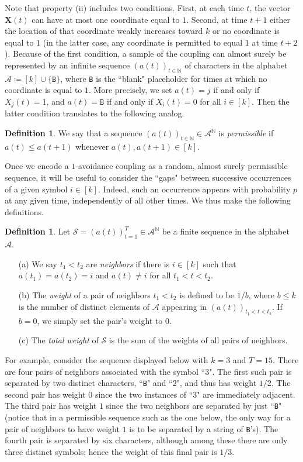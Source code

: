 \documentclass[11pt,reqno]{amsart} %
\numberwithin{equation}{section}
\newcommand{\N}{\mathbb{N}}
\renewcommand{\a}{\mathcal{A}}
\newcommand{\s}{\mathcal{S}}
\theoremstyle{definition}
\newtheorem{defn}[thm]{Definition}
\newcommand{\vc}[1]{{\mathbf #1}}
\begin{document}
Note that property (ii) includes two conditions.  
First, at each time $t$, the vector $\vc X(t)$ can have at most one coordinate equal to $1$.
Second, at time $t+1$ either the location of that coordinate weakly increases toward $k$ or no coordinate is equal to $1$ (in the latter case, any coordinate is permitted to equal $1$ at time $t+2$).
Because of the first condition, a sample of the coupling can almost surely be represented by an infinite sequence $(a(t))_{t\in\N}$ of characters in the alphabet $\a \coloneqq [k] \cup \{\texttt{B}\}$, where \texttt{B} is the ``blank" placeholder for times at which no coordinate is equal to $1$.
More precisely, we set $a(t) = j$ if and only if $X_j(t) = 1$, and $a(t) = \texttt{B}$ if and only if $X_i(t) = 0$ for all $i\in[k]$.
Then the latter condition translates to the following analog.

\begin{defn} \label{permissible_defn}
We say that a sequence $(a(t))_{t\in\N} \in \a^\N$ is \textit{permissible} if $a(t) \leq a(t+1)$ whenever $a(t),a(t+1) \in [k]$.
\end{defn}

Once we encode a $1$-avoidance coupling as a random, almost surely permissible sequence, it will be useful to consider the ``gaps" between successive occurrences of a given symbol $i \in [k]$.
Indeed, such an occurrence appears with probability $p$ at any given time, independently of all other times.
We thus make the following definitions.

\begin{defn} \label{weight_defn}
Let $\s = (a(t))_{t=1}^T \in \a^\N$ be a finite sequence in the alphabet $\a$.
\begin{itemize}
\item[(a)] We say $t_1 < t_2$ are \textit{neighbors} if there is $i \in [k]$ such that $a(t_1) = a(t_2) = i$ and $a(t) \neq i$ for all $t_1 < t < t_2$.
\item[(b)] The \emph{weight} of a pair of neighbors $t_1 < t_2$ is defined to be $1/b$, where $b \leq k$ is the number of distinct elements of $\a$ appearing in $(a(t))_{t_1 < t < t_2}$.
If $b=0$, we simply set the pair's weight to $0$.
\item[(c)] The \emph{total weight} of $\s$ is the sum of the weights of all pairs of neighbors.
\end{itemize}
\end{defn}

For example, consider the sequence displayed below with $k = 3$ and $T=15$.
There are four pairs of neighbors associated with the symbol ``$3$".
The first such pair is separated by two distinct characters, ``\texttt{B}" and ``$2$", and thus has weight $1/2$.
The second pair has weight $0$ since the two instances of ``3" are immediately adjacent.
The third pair has weight $1$ since the two neighbors are separated by just ``\texttt{B}" (notice that in a permissible sequence such as the one below, the only way for a pair of neighbors to have weight $1$ is to be separated by a string of \texttt{B}'s).
The fourth pair is separated by six characters, although among these there are only three distinct symbols; hence the weight of this final pair is $1/3$.
\end{document}
